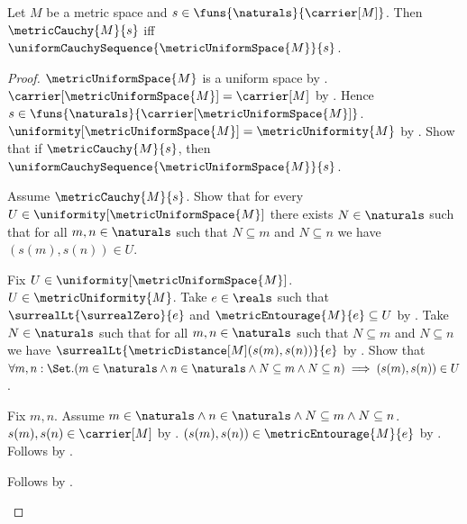 \begin{theorem}\label{metric_uniform_cauchy_sequence_iff}
    Let $M$ be a metric space and
        $s\in\funs{\naturals}{\carrier[M]}$.
    Then
        $\metricCauchy{M}{s}$ iff
        $\uniformCauchySequence{\metricUniformSpace{M}}{s}$.
\end{theorem}
\begin{proof}
    $\metricUniformSpace{M}$ is a uniform space by
        .
    $\carrier[\metricUniformSpace{M}]=\carrier[M]$
        by .
    Hence $s\in\funs{\naturals}
        {\carrier[\metricUniformSpace{M}]}$.
    $\uniformity[\metricUniformSpace{M}]=\metricUniformity{M}$
        by .
    Show that if $\metricCauchy{M}{s}$, then
        $\uniformCauchySequence{\metricUniformSpace{M}}{s}$.
    \begin{subproof}
        Assume $\metricCauchy{M}{s}$.
        Show that for every
            $U\in\uniformity[\metricUniformSpace{M}]$ there exists
            $N\in\naturals$ such that for all $m,n\in\naturals$ such that
            $N\subseteq m$ and $N\subseteq n$ we have $(s(m),s(n))\in U$.
        \begin{subproof}
            Fix $U\in\uniformity[\metricUniformSpace{M}]$.
            $U\in\metricUniformity{M}$.
            Take $e\in\reals$ such that
                $\surrealLt{\surrealZero}{e}$ and
                $\metricEntourage{M}{e}\subseteq U$
                by .
            Take $N\in\naturals$ such that for all $m,n\in\naturals$
                such that $N\subseteq m$ and $N\subseteq n$ we have
                $\surrealLt{\metricDistance[M](s(m),s(n))}{e}$
                by .
            Show that
                $\forall m,n:\Set.
                    (m\in\naturals\land n\in\naturals\land
                     N\subseteq m\land N\subseteq n)
                    \implies (s(m),s(n))\in U$.
            \begin{subproof}
                Fix $m,n$.
                Assume
                    $m\in\naturals\land n\in\naturals\land
                    N\subseteq m\land N\subseteq n$.
                $s(m),s(n)\in\carrier[M]$
                    by .
                $(s(m),s(n))\in\metricEntourage{M}{e}$
                    by .
                Follows by .
            \end{subproof}
            Follows by \auto.

\end{subproof}
\end{subproof}
\end{proof}
